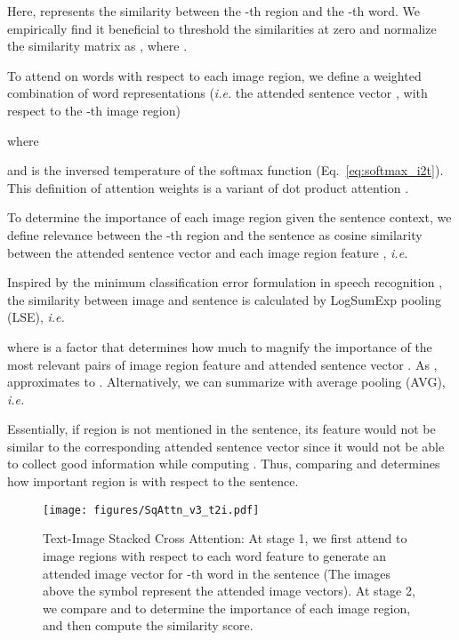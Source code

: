 \documentclass[runningheads]{llncs}
\begin{document}
Here,  represents the similarity between the -th region and the -th word. We empirically find it beneficial to threshold the similarities at zero \cite{karpathy2014deep} and normalize the similarity matrix as , where .

To attend on words with respect to each image region, we define a weighted combination of word representations ({\em i.e.} the attended sentence vector , with respect to the -th image region)


where

and  is the inversed temperature of the softmax function \cite{chorowski2015attention} (Eq.~\eqref{eq:softmax_i2t}). This definition of attention weights is a variant of dot product attention \cite{luong2015effective}.

To determine the importance of each image region given the sentence context, we define relevance between the -th region and the sentence as cosine similarity between the attended sentence vector  and each image region feature , {\em i.e.}

Inspired by the minimum classification error formulation in speech recognition \cite{juang1997minimum,he2008discriminative}, the similarity between image  and sentence  is calculated by LogSumExp pooling (LSE), {\em i.e.}

where  is a factor that determines how much to magnify the importance of the most relevant pairs of image region feature  and attended sentence vector . As ,  approximates to .
Alternatively, we can summarize  with average pooling (AVG), {\em i.e.}

Essentially, if region  is not mentioned in the sentence, its feature  would not be similar to the corresponding attended sentence vector  since it would not be able to collect good information while computing . Thus, comparing  and  determines how important region  is with respect to the sentence.

\begin{figure}[t]
\centering
\texttt{[image: figures/SqAttn\_v3\_t2i.pdf]}
\caption{Text-Image Stacked Cross Attention:  At stage 1, we first attend to image regions with respect to each word feature  to generate an attended image vector  for -th word in the sentence (The images above the symbol  represent the attended image vectors). At stage 2, we compare  and  to determine the importance of each image region, and then compute the similarity score.}
\label{fig:sqattn_t2i}
\end{figure}
\end{document}
